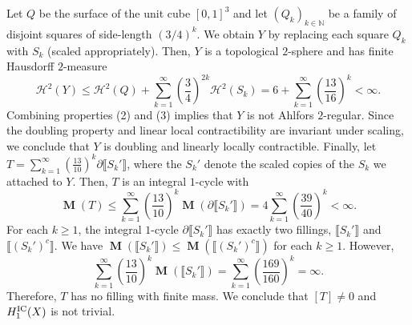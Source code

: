 \documentclass{amsart}
\numberwithin{equation}{section}
\newcommand{\N}{\mathbb{N}}
\newcommand{\Ha}{\mathcal{H}}
\DeclareMathOperator{\bM}{\mathbf{M}}
\newcommand{\bb}[1]{\llbracket #1\rrbracket}
\begin{document}
                Let $Q$ be the surface of the unit cube $[0,1]^3$ and let $(Q_k)_{k\in \N}$ be a family of disjoint squares of side-length $\left(3/4\right)^k$. We obtain $Y$ by replacing each square $Q_k$ with $S_k$ (scaled appropriately). Then, $Y$ is a topological $2$-sphere and has finite Hausdorff $2$-measure 
                $$\Ha^2(Y) \leq \Ha^2(Q) + \sum_{k=1}^\infty \left(\frac{3}{4}\right)^{2k} \Ha^2(S_k) = 6 +\sum_{k=1}^\infty \left(\frac{13}{16}\right)^k <\infty.$$ 
                Combining properties (2) and (3) implies that $Y$ is not Ahlfors $2$-regular. Since the doubling property and linear local contractibility are invariant under scaling, we conclude that $Y$ is doubling and linearly locally contractible. Finally, let $T = \sum_{k=1}^\infty \left(\frac{13}{10}\right)^k \partial\bb{S_k'}$, where the $S_k'$ denote the scaled copies of the $S_k$ we attached to $Y$. Then, $T$ is an integral $1$-cycle with
                $$\bM(T) \leq  \sum_{k=1}^\infty \left(\frac{13}{10}\right)^k \bM(\partial\bb{S_k'}) = 4 \sum_{k=1}^\infty \left(\frac{39}{40}\right)^k <\infty. $$
                For each $k \geq 1$, the integral $1$-cycle $\partial\bb{S_k'}$ has exactly two fillings, $\bb{S_k'}$ and $\bb{(S_k')^c}$. We have $\bM(\bb{S_k'} )\leq \bM(\bb{(S_k')^c})$ for each $k \geq 1$.
                However,
                $$\sum_{k=1}^\infty \left(\frac{13}{10}\right)^k \bM(\bb{S_k'}) = \sum_{k=1}^\infty \left(\frac{169}{160}\right)^k= \infty.$$
                Therefore, $T$ has no filling with finite mass. We conclude that $[T]\neq 0 $ and $H_1^\textup{IC}(X)$ is not trivial.
\end{document}
